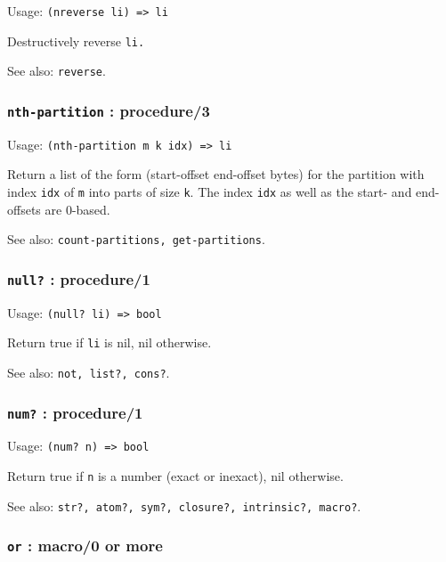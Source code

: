 \documentclass[
]{article}
\newcommand{\passthrough}[1]{#1}
\begin{document}
Usage: \passthrough{\lstinline!(nreverse li) => li!}

Destructively reverse \passthrough{\lstinline!li.!}

See also: \passthrough{\lstinline!reverse!}.

\hypertarget{nth-partition-procedure3}{%
\subsubsection{\texorpdfstring{\texttt{nth-partition} :
procedure/3}{nth-partition : procedure/3}}\label{nth-partition-procedure3}}

Usage: \passthrough{\lstinline!(nth-partition m k idx) => li!}

Return a list of the form (start-offset end-offset bytes) for the
partition with index \passthrough{\lstinline!idx!} of
\passthrough{\lstinline!m!} into parts of size
\passthrough{\lstinline!k!}. The index \passthrough{\lstinline!idx!} as
well as the start- and end-offsets are 0-based.

See also: \passthrough{\lstinline!count-partitions, get-partitions!}.

\hypertarget{null-procedure1}{%
\subsubsection{\texorpdfstring{\texttt{null?} :
procedure/1}{null? : procedure/1}}\label{null-procedure1}}

Usage: \passthrough{\lstinline!(null? li) => bool!}

Return true if \passthrough{\lstinline!li!} is nil, nil otherwise.

See also: \passthrough{\lstinline!not, list?, cons?!}.

\hypertarget{num-procedure1}{%
\subsubsection{\texorpdfstring{\texttt{num?} :
procedure/1}{num? : procedure/1}}\label{num-procedure1}}

Usage: \passthrough{\lstinline!(num? n) => bool!}

Return true if \passthrough{\lstinline!n!} is a number (exact or
inexact), nil otherwise.

See also:
\passthrough{\lstinline!str?, atom?, sym?, closure?, intrinsic?, macro?!}.

\hypertarget{or-macro0-or-more}{%
\subsubsection{\texorpdfstring{\texttt{or} : macro/0 or
more}{or : macro/0 or more}}\label{or-macro0-or-more}}
\end{document}
